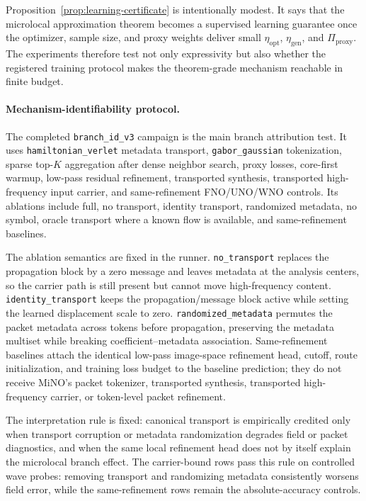 Proposition~\ref{prop:learning-certificate} is intentionally modest.  It says that the microlocal approximation theorem becomes a supervised learning guarantee once the optimizer, sample size, and proxy weights deliver small $\eta_{\mathrm{opt}}$, $\eta_{\mathrm{gen}}$, and $\Pi_{\mathrm{proxy}}$.  The experiments therefore test not only expressivity but also whether the registered training protocol makes the theorem-grade mechanism reachable in finite budget.

\paragraph{Mechanism-identifiability protocol.}
\label{sec:transport-identifiability-campaign}
The completed \texttt{branch\_id\_v3} campaign is the main branch attribution test.  It uses \texttt{hamiltonian\_verlet} metadata transport, \texttt{gabor\_gaussian} tokenization, sparse top-$K$ aggregation after dense neighbor search, proxy losses, core-first warmup, low-pass residual refinement, transported synthesis, transported high-frequency input carrier, and same-refinement FNO/UNO/WNO controls.  Its ablations include full, no transport, identity transport, randomized metadata, no symbol, oracle transport where a known flow is available, and same-refinement baselines.

The ablation semantics are fixed in the runner.  \texttt{no\_transport} replaces the propagation block by a zero message and leaves metadata at the analysis centers, so the carrier path is still present but cannot move high-frequency content.  \texttt{identity\_transport} keeps the propagation/message block active while setting the learned displacement scale to zero.  \texttt{randomized\_metadata} permutes the packet metadata across tokens before propagation, preserving the metadata multiset while breaking coefficient--metadata association.  Same-refinement baselines attach the identical low-pass image-space refinement head, cutoff, route initialization, and training loss budget to the baseline prediction; they do not receive MiNO's packet tokenizer, transported synthesis, transported high-frequency carrier, or token-level packet refinement.

The interpretation rule is fixed: canonical transport is empirically credited only when transport corruption or metadata randomization degrades field or packet diagnostics, and when the same local refinement head does not by itself explain the microlocal branch effect.  The carrier-bound rows pass this rule on controlled wave probes: removing transport and randomizing metadata consistently worsens field error, while the same-refinement rows remain the absolute-accuracy controls.


